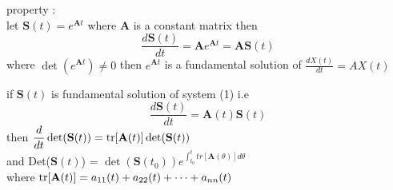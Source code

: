 \documentclass[]{article}
\begin{document}
property :
\\
let $\displaystyle \mathbf{S}(t) = e^{\mathbf{A}t}$ where $\mathbf{A}$ is a constant matrix then
\[
    \frac{d\mathbf{S}(t)}{dt} = \mathbf{A}e^{\mathbf{A}t} = \mathbf{A}\mathbf{S}(t)
\]
where $\det(e^{\mathbf{A}t})\neq 0$
then $e^{\mathbf{A}t}$ is a fundamental solution of $\displaystyle \frac{dX(t)}{dt} = AX(t)$
\newpage
\begin{theorem}[]
    if $\mathbf{S}(t)$ is fundamental solution of system (1) i.e
    \[
        \frac{d\mathbf{S}(t)}{dt} = \mathbf{A}(t)\mathbf{S}(t)
    \]
    then $\displaystyle \frac{d}{dt}\det(\mathbf{S}(t)) = \trace[\mathbf{A}(t)] \det(\mathbf{S}(t))$
    \\
    and Det($\mathbf{S}(t)$) = $\det(\mathbf{S}(t_0))e^{\int_{t_0}^{t}tr[\mathbf{A}(\theta)]d\theta}$
    \\
    where $\trace[\mathbf{A}(t)] = a_{11}(t) + a_{22}(t) + \dots + a_{nn}(t)$
\end{theorem}
\end{document}
